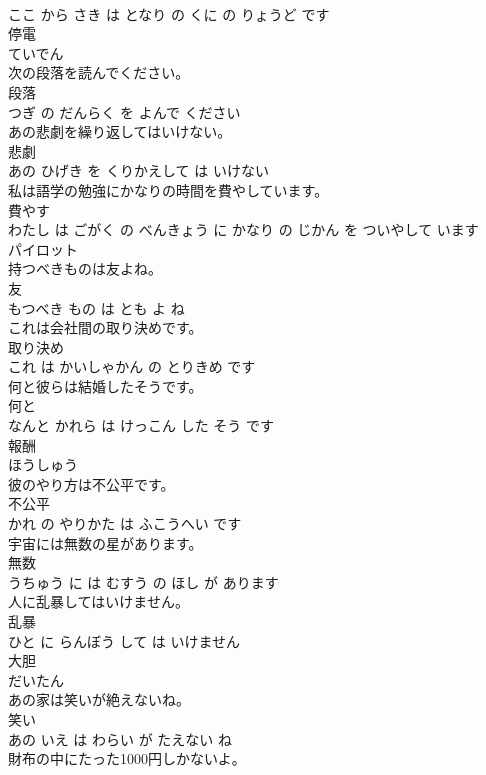 \documentclass[8pt]{extreport}
\begin{document}
\begin{CJK}{UTF8}{min}
\\	ここ から さき は となり の くに の りょうど です			
\\	停電	
\\	ていでん		
\\	次の段落を読んでください。	
\\	段落 
\\	つぎ の だんらく を よんで ください			
\\	あの悲劇を繰り返してはいけない。	
\\	悲劇 
\\	あの ひげき を くりかえして は いけない			
\\	私は語学の勉強にかなりの時間を費やしています。	
\\	費やす 
\\	わたし は ごがく の べんきょう に かなり の じかん を ついやして います			
\\	パイロット	
\\	持つべきものは友よね。	
\\	友 
\\	もつべき もの は とも よ ね			
\\	これは会社間の取り決めです。	
\\	取り決め 
\\	これ は かいしゃかん の とりきめ です			
\\	何と彼らは結婚したそうです。	
\\	何と 
\\	なんと かれら は けっこん した そう です			
\\	報酬	
\\	ほうしゅう		
\\	彼のやり方は不公平です。	
\\	不公平 
\\	かれ の やりかた は ふこうへい です			
\\	宇宙には無数の星があります。	
\\	無数 
\\	うちゅう に は むすう の ほし が あります			
\\	人に乱暴してはいけません。	
\\	乱暴 
\\	ひと に らんぼう して は いけません			
\\	大胆	
\\	だいたん		
\\	あの家は笑いが絶えないね。	
\\	笑い 
\\	あの いえ は わらい が たえない ね			
\\	財布の中にたった1000円しかないよ。	

\end{CJK}
\end{document}
